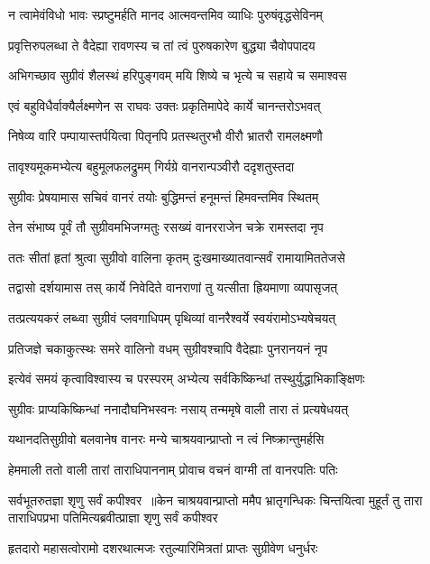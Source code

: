 \twolineshloka
{न त्वामेवंविधो भावः स्प्रष्टुमर्हति मानद}
{आत्मवन्तमिव व्याधिः पुरुषंवृद्धसेविनम्}


\twolineshloka
{प्रवृत्तिरुपलब्धा ते वैदेह्या रावणस्य च}
{तां त्वं पुरुषकारेण बुद्ध्या चैवोपपादय}


\twolineshloka
{अभिगच्छाव सुग्रीवं शैलस्थं हरिपुङ्गवम्}
{मयि शिष्ये च भृत्ये च सहाये च समाश्वस}


\twolineshloka
{एवं बहुविधैर्वाक्यैर्लक्ष्मणेन स राघवः}
{उक्तः प्रकृतिमापेदे कार्ये चानन्तरोऽभवत्}


\twolineshloka
{निषेव्य वारि पम्पायास्तर्पयित्वा पितृनपि}
{प्रतस्थतुरभौ वीरौ भ्रातरौ रामलक्ष्मणौ}


\twolineshloka
{तावृश्यमूकमभ्येत्य बहुमूलफलद्रुमम्}
{गिर्यग्रे वानरान्पञ्वीरौ ददृशतुस्तदा}


\twolineshloka
{सुग्रीवः प्रेषयामास सचिवं वानरं तयोः}
{बुद्धिमन्तं हनूमन्तं हिमवन्तमिव स्थितम्}


\twolineshloka
{तेन संभाष्य पूर्वं तौ सुग्रीवमभिजग्मतुः}
{रसख्यं वानरराजेन चक्रे रामस्तदा नृप}


\twolineshloka
{ततः सीतां हृतां श्रुत्वा सुग्रीवो वालिना कृतम्}
{दुःखमाख्यातवान्सर्वं रामायामिततेजसे}


\twolineshloka
{तद्वासो दर्शयामास तस् कार्ये निवेदिते}
{वानराणां तु यत्सीता ह्रियमाणा व्यपासृजत्}


\twolineshloka
{तत्प्रत्ययकरं लब्ध्वा सुग्रीवं प्लवगाधिपम्}
{पृथिव्यां वानरैश्वर्ये स्वयंरामोऽभ्यषेचयत्}


\twolineshloka
{प्रतिजज्ञे चकाकुत्स्थः समरे वालिनो वधम्}
{सुग्रीवश्चापि वैदेह्याः पुनरानयनं नृप}


\twolineshloka
{इत्येवं समयं कृत्वाविश्वास्य च परस्परम्}
{अभ्येत्य सर्वकिष्किन्धां तस्थुर्युद्धाभिकाङ्क्षिणः}


\twolineshloka
{सुग्रीवः प्राप्यकिष्किन्धां ननादौघनिभस्वनः}
{नसाय् तन्ममृषे वाली तारा तं प्रत्यषेधयत्}


\twolineshloka
{यथानदतिसुग्रीवो बलवानेष वानरः}
{मन्ये चाश्रयवान्प्राप्तो न त्वं निष्क्रान्तुमर्हसि}


\twolineshloka
{हेममाली ततो वाली तारां ताराधिपाननाम्}
{प्रोवाच वचनं वाग्मी तां वानरपतिः पतिः}


सर्वभूतरुतज्ञा शृणु सर्वं कपीश्वर ॥केन चाश्रयवान्प्राप्तो ममैप भ्रातृगन्धिकः
\twolineshloka
{चिन्तयित्वा मुहूर्तं तु तारा ताराधिपप्रभा}
{पतिमित्यब्रवीत्प्राज्ञा शृणु सर्वं कपीश्वर}


\twolineshloka
{हृतदारो महासत्वोरामो दशरथात्मजः}
{रतुल्यारिमित्रतां प्राप्तः सुग्रीवेण धनुर्धरः}


